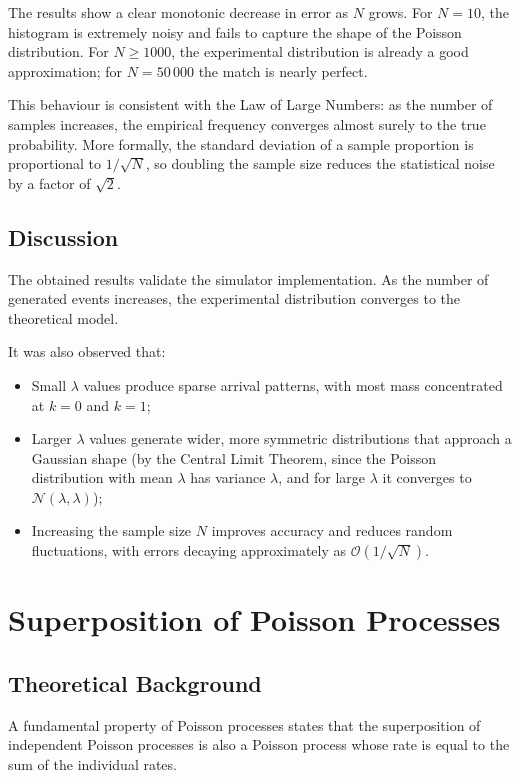 \documentclass[12pt]{article}
\begin{document}
The results show a clear monotonic decrease in error as $N$ grows. For $N=10$, the histogram
is extremely noisy and fails to capture the shape of the Poisson distribution. For $N \geq 1000$,
the experimental distribution is already a good approximation; for $N = 50\,000$ the match is
nearly perfect.

This behaviour is consistent with the Law of Large Numbers: as the number of samples
increases, the empirical frequency converges almost surely to the true probability. More
formally, the standard deviation of a sample proportion is proportional to $1/\sqrt{N}$, so
doubling the sample size reduces the statistical noise by a factor of $\sqrt{2}$.

\subsection{Discussion}

The obtained results validate the simulator implementation. As the number of generated
events increases, the experimental distribution converges to the theoretical model.

It was also observed that:

\begin{itemize}
    \item Small $\lambda$ values produce sparse arrival patterns, with most mass concentrated at $k=0$ and $k=1$;
    \item Larger $\lambda$ values generate wider, more symmetric distributions that approach a Gaussian shape (by the Central Limit Theorem, since the Poisson distribution with mean $\lambda$ has variance $\lambda$, and for large $\lambda$ it converges to $\mathcal{N}(\lambda, \lambda)$);
    \item Increasing the sample size $N$ improves accuracy and reduces random fluctuations, with errors decaying approximately as $\mathcal{O}(1/\sqrt{N})$.
\end{itemize}

\section{Superposition of Poisson Processes}

\subsection{Theoretical Background}

A fundamental property of Poisson processes states that the superposition of independent Poisson processes is also a Poisson process whose rate is equal to the sum of the individual rates.
\end{document}
